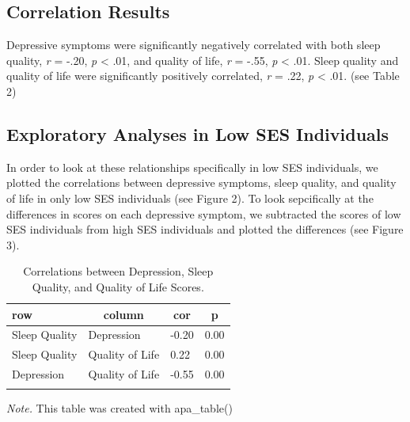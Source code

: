 \documentclass[man, noextraspace]{apa6}
\theoremstyle{definition}
\theoremstyle{definition}
\theoremstyle{definition}
\theoremstyle{remark}
\begin{document}
\subsection{Correlation Results}\label{correlation-results}

Depressive symptoms were significantly negatively correlated with both
sleep quality, \emph{r} = -.20, \emph{p} \textless{} .01, and quality of
life, \emph{r} = -.55, \emph{p} \textless{} .01. Sleep quality and
quality of life were significantly positively correlated, \emph{r} =
.22, \emph{p} \textless{} .01. (see Table 2)

\subsection{Exploratory Analyses in Low SES
Individuals}\label{exploratory-analyses-in-low-ses-individuals}

In order to look at these relationships specifically in low SES
individuals, we plotted the correlations between depressive symptoms,
sleep quality, and quality of life in only low SES individuals (see
Figure 2). To look sepcifically at the differences in scores on each
depressive symptom, we subtracted the scores of low SES individuals from
high SES individuals and plotted the differences (see Figure 3).

\begin{table}[tbp]
\begin{center}
\begin{threeparttable}
\caption{\label{tab:table2}Correlations between Depression, Sleep Quality, and Quality of Life Scores.}
\begin{tabular}{llll}
\toprule
row & \multicolumn{1}{c}{column} & \multicolumn{1}{c}{cor} & \multicolumn{1}{c}{p}\\
\midrule
Sleep Quality & Depression & -0.20 & 0.00\\
Sleep Quality & Quality of Life & 0.22 & 0.00\\
Depression & Quality of Life & -0.55 & 0.00\\
\bottomrule
\addlinespace
\end{tabular}
\begin{tablenotes}[para]
\normalsize{\textit{Note.} This table was created with apa\_table()}
\end{tablenotes}
\end{threeparttable}
\end{center}
\end{table}
\end{document}
